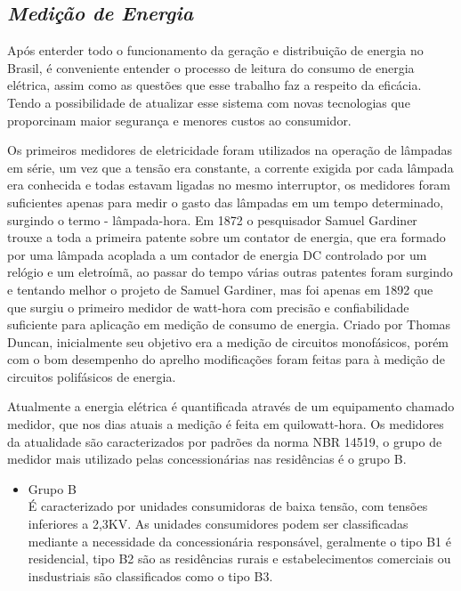 \addtocounter{footnote}{-1}
\addtocounter{footnote}{1}

\subsection[\textit{Medição de Energia}]{\textit{Medição de Energia}}\label{med-energia}

Após enterder todo o funcionamento da geração e distribuição de energia no Brasil, é conveniente entender o processo de leitura do consumo de 
energia elétrica, assim como as questões que esse trabalho faz a respeito da eficácia. Tendo a possibilidade de atualizar esse sistema com novas 
tecnologias que proporcinam maior segurança e menores custos ao consumidor.

Os primeiros medidores de eletricidade foram utilizados na operação de lâmpadas em série, um vez que a tensão era constante, a corrente exigida
por cada lâmpada era conhecida e todas estavam ligadas no mesmo interruptor, os medidores foram suficientes apenas para medir o gasto das lâmpadas
em um tempo determinado, surgindo o termo - lâmpada-hora. Em 1872 o pesquisador Samuel Gardiner trouxe a toda a primeira patente sobre um contator 
de energia, que era formado por uma lâmpada acoplada a um contador de energia DC controlado por um relógio e um eletroímã, ao passar do tempo várias
outras patentes foram surgindo e tentando melhor o projeto de Samuel Gardiner, mas foi apenas em 1892 que que surgiu o primeiro medidor de watt-hora
com precisão e confiabilidade suficiente para aplicação em medição de consumo de energia. Criado por Thomas Duncan, inicialmente seu objetivo era a medição
de circuitos monofásicos, porém com o bom desempenho do aprelho modificações foram feitas para à medição de circuitos polifásicos de energia.

Atualmente a energia elétrica é quantificada através de um equipamento chamado medidor, que nos dias atuais a medição é feita em quilowatt-hora.
Os medidores da atualidade são caracterizados por padrões da norma NBR 14519, o grupo de medidor mais utilizado pelas concessionárias nas residências
é o grupo B. 

\begin{itemize}
	\item Grupo B \\
	É caracterizado por unidades consumidoras de baixa tensão, com tensões inferiores a 2,3KV. As unidades consumidores podem ser classificadas
	mediante a necessidade da concessionária responsável, geralmente o tipo B1 é residencial, tipo B2 são as residências rurais e estabelecimentos
	comerciais ou insdustriais são classificados como o tipo B3.
\end{itemize}

